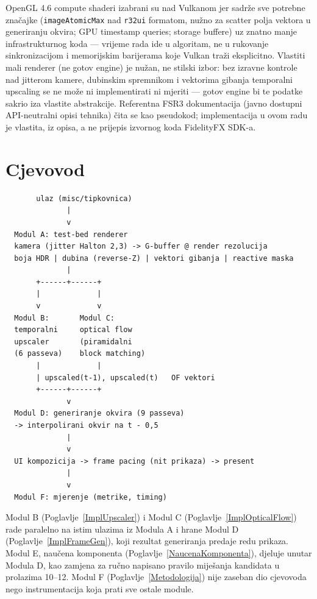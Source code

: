 \documentclass{mathos}
\begin{document}
OpenGL 4.6 compute shaderi izabrani su nad Vulkanom jer sadrže sve potrebne
značajke (\verb+imageAtomicMax+ nad \verb+r32ui+ formatom, nužno za scatter
polja vektora u generiranju okvira; GPU timestamp queries; storage buffere)
uz znatno manje infrastrukturnog koda — vrijeme rada ide u algoritam, ne u
rukovanje sinkronizacijom i memorijskim barijerama koje Vulkan traži
eksplicitno. Vlastiti mali renderer (ne gotov engine) je nužan, ne stilski
izbor: bez izravne kontrole nad jitterom kamere, dubinskim spremnikom i
vektorima gibanja temporalni upscaling se ne može ni implementirati ni
mjeriti — gotov engine bi te podatke sakrio iza vlastite abstrakcije.
Referentna FSR3 dokumentacija (javno dostupni API-neutralni opisi tehnika)
čita se kao pseudokod; implementacija u ovom radu je vlastita, iz opisa, a
ne prijepis izvornog koda FidelityFX SDK-a.

\section{Cjevovod}

\begin{center}
\begin{verbatim}
       ulaz (misc/tipkovnica)
              |
              v
  Modul A: test-bed renderer
  kamera (jitter Halton 2,3) -> G-buffer @ render rezolucija
  boja HDR | dubina (reverse-Z) | vektori gibanja | reactive maska
              |
       +------+------+
       |             |
       v             v
  Modul B:       Modul C:
  temporalni     optical flow
  upscaler       (piramidalni
  (6 passeva)    block matching)
       |             |
       | upscaled(t-1), upscaled(t)   OF vektori
       +------+------+
              v
  Modul D: generiranje okvira (9 passeva)
  -> interpolirani okvir na t - 0,5
              |
              v
  UI kompozicija -> frame pacing (nit prikaza) -> present
              |
              v
  Modul F: mjerenje (metrike, timing)
\end{verbatim}
\end{center}

Modul B (Poglavlje~\ref{ImplUpscaler}) i Modul C (Poglavlje~\ref{ImplOpticalFlow})
rade paralelno na istim ulazima iz Modula A i hrane Modul D
(Poglavlje~\ref{ImplFrameGen}), koji rezultat generiranja predaje redu prikaza.
Modul E, naučena komponenta (Poglavlje~\ref{NaucenaKomponenta}), djeluje unutar
Modula D, kao zamjena za ručno napisano pravilo miješanja kandidata u
prolazima 10--12. Modul F (Poglavlje~\ref{Metodologija}) nije zaseban dio
cjevovoda nego instrumentacija koja prati sve ostale module.
\end{document}
